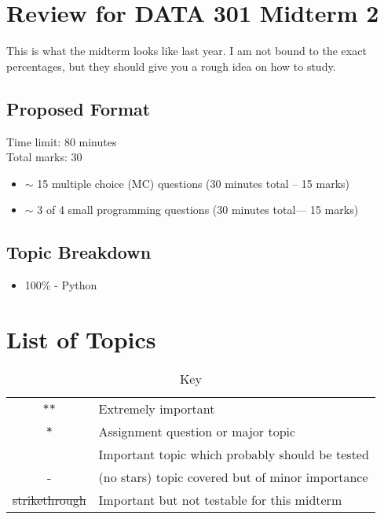 \documentclass{article}%
\begin{document}
\section{Review for DATA 301 Midterm 2}

This is what the midterm looks like last year.  I am not bound to the exact percentages, but they should give you a rough idea on how to study.

\subsection{Proposed Format}

Time limit: 80 minutes\\
Total marks: 30\\

\begin{itemize}
\item $\sim$ 15 multiple choice (MC) questions   (30 minutes total -- 15 marks)
\item $\sim$  3 of 4 small programming questions (30 minutes total--- 15 marks)
\end{itemize}


\subsection{Topic Breakdown}

\begin{itemize}
\item  100\% - Python
\end{itemize}


%
%
%
%
%
%
%
%


\section{List of Topics}


\begin{table}[h]
\caption{Key}
\begin{center}
\begin{tabular}{|c|l|}
\hline
{\tt ***} & Extremely important\\
 {\tt **} & Assignment question or major topic\\
  {\tt *} &Important topic which probably should be tested\\
    -& (no stars) topic covered but of minor importance\\
   \st{strikethrough} & Important but not testable for this midterm\\ 
\hline
\end{tabular}
\end{center}
\label{default}
\end{table}%
\end{document}
